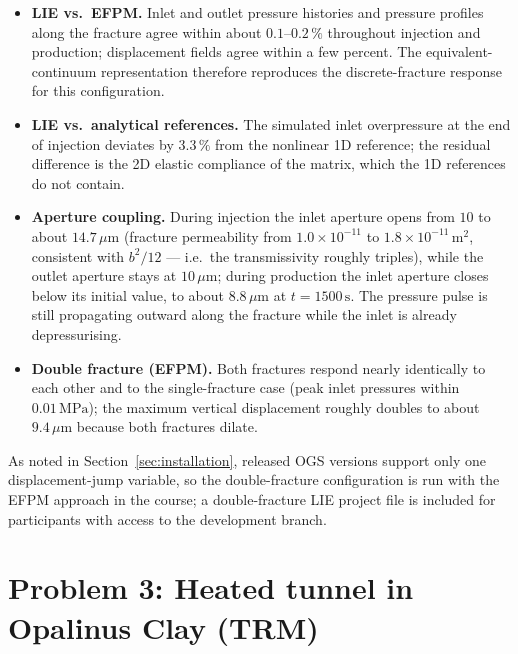 \documentclass[11pt,a4paper]{tubaf-report}
\newcommand{\MPa}{\,\mathrm{MPa}}
\begin{document}
\begin{itemize}[nosep]
  \item \textbf{LIE vs.\ EFPM.} Inlet and outlet pressure histories and
        pressure profiles along the fracture agree within about
        $0.1$--$0.2\,\%$ throughout injection and production; displacement
        fields agree within a few percent. The equivalent-continuum
        representation therefore reproduces the discrete-fracture response
        for this configuration.
  \item \textbf{LIE vs.\ analytical references.} The simulated inlet
        overpressure at the end of injection deviates by $3.3\,\%$ from the
        nonlinear 1D reference; the residual difference is the 2D elastic
        compliance of the matrix, which the 1D references do not contain.
  \item \textbf{Aperture coupling.} During injection the inlet aperture
        opens from $10$ to about $14.7\,\mu\mathrm m$
        (fracture permeability from $1.0\times10^{-11}$ to
        $1.8\times10^{-11}\,\mathrm{m^2}$, consistent with $b^2/12$ ---
        i.e.\ the transmissivity roughly triples), while the outlet aperture
        stays at $10\,\mu\mathrm m$; during production the inlet aperture
        closes below its initial value, to about $8.8\,\mu\mathrm m$ at
        $t=1500\,\mathrm s$. The pressure pulse is still propagating outward
        along the fracture while the inlet is already depressurising.
  \item \textbf{Double fracture (EFPM).} Both fractures respond nearly
        identically to each other and to the single-fracture case
        (peak inlet pressures within $0.01\MPa$); the maximum vertical
        displacement roughly doubles to about $9.4\,\mu\mathrm m$ because
        both fractures dilate.
\end{itemize}

As noted in Section~\ref{sec:installation}, released OGS versions support
only one displacement-jump variable, so the double-fracture configuration is
run with the EFPM approach in the course; a double-fracture LIE project file
is included for participants with access to the development branch.

\chapter{Problem 3: Heated tunnel in Opalinus Clay (TRM)}
\label{ch:trm}
\end{document}
